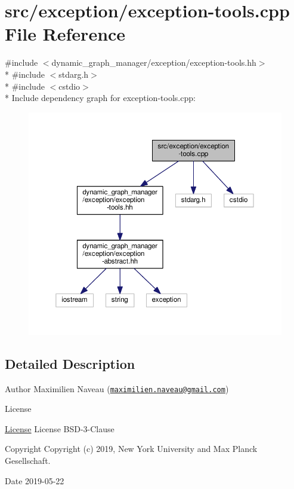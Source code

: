 \hypertarget{exception-tools_8cpp}{}\section{src/exception/exception-\/tools.cpp File Reference}
\label{exception-tools_8cpp}
{\ttfamily \#include $<$dynamic\+\_\+graph\+\_\+manager/exception/exception-\/tools.\+hh$>$}\\*
{\ttfamily \#include $<$stdarg.\+h$>$}\\*
{\ttfamily \#include $<$cstdio$>$}\\*
Include dependency graph for exception-\/tools.cpp\+:
\nopagebreak
\begin{figure}[H]
\begin{center}
\leavevmode
\includegraphics[width=350pt]{exception-tools_8cpp__incl}
\end{center}
\end{figure}


\subsection{Detailed Description}
\begin{DoxyAuthor}{Author}
Maximilien Naveau (\href{mailto:maximilien.naveau@gmail.com}{\tt maximilien.\+naveau@gmail.\+com}) 
\end{DoxyAuthor}
\begin{DoxyRefDesc}{License}
\item[\hyperlink{license__license000052}{License}]License B\+S\+D-\/3-\/\+Clause \end{DoxyRefDesc}
\begin{DoxyCopyright}{Copyright}
Copyright (c) 2019, New York University and Max Planck Gesellschaft. 
\end{DoxyCopyright}
\begin{DoxyDate}{Date}
2019-\/05-\/22 
\end{DoxyDate}
